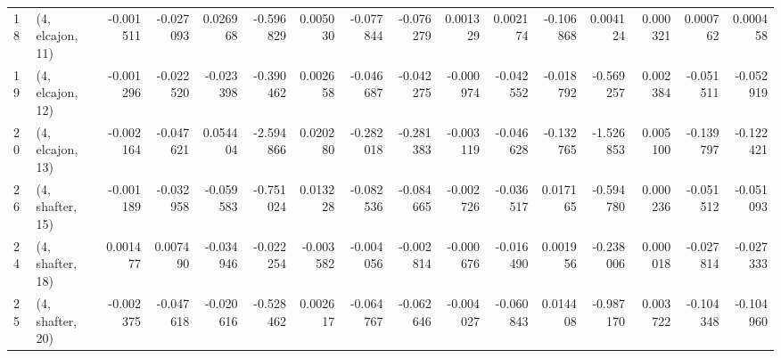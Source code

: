 \begin{tabular}{llrrrrrrrrrrrrrr}
18 &  (4, elcajon, 11) &  -0.001511 & -0.027093 &  0.026968 &  -0.596829 &  0.005030 &  -0.077844 & -0.076279 &  0.001329 &  0.002174 & -0.106868 &   0.004124 &  0.000321 &  0.000762 &  0.000458 \\
19 &  (4, elcajon, 12) &  -0.001296 & -0.022520 & -0.023398 &  -0.390462 &  0.002658 &  -0.046687 & -0.042275 & -0.000974 & -0.042552 & -0.018792 &  -0.569257 &  0.002384 & -0.051511 & -0.052919 \\
20 &  (4, elcajon, 13) &  -0.002164 & -0.047621 &  0.054404 &  -2.594866 &  0.020280 &  -0.282018 & -0.281383 & -0.003119 & -0.046628 & -0.132765 &  -1.526853 &  0.005100 & -0.139797 & -0.122421 \\
26 &  (4, shafter, 15) &  -0.001189 & -0.032958 & -0.059583 &  -0.751024 &  0.013228 &  -0.082536 & -0.084665 & -0.002726 & -0.036517 &  0.017165 &  -0.594780 &  0.000236 & -0.051512 & -0.051093 \\
24 &  (4, shafter, 18) &   0.001477 &  0.007490 & -0.034946 &  -0.022254 & -0.003582 &  -0.004056 & -0.002814 & -0.000676 & -0.016490 &  0.001956 &  -0.238006 &  0.000018 & -0.027814 & -0.027333 \\
25 &  (4, shafter, 20) &  -0.002375 & -0.047618 & -0.020616 &  -0.528462 &  0.002617 &  -0.064767 & -0.062646 & -0.004027 & -0.060843 &  0.014408 &  -0.987170 &  0.003722 & -0.104348 & -0.104960 \\
\bottomrule
\end{tabular}
